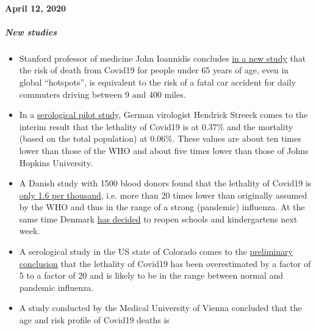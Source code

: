 \hypertarget{april-12-2020}{%
\paragraph{April 12, 2020}\label{april-12-2020}}

\hypertarget{new-studies}{%
\subparagraph{\texorpdfstring{\textbf{New
studies}}{New studies}}\label{new-studies}}

\begin{itemize}
\tightlist
\item
  Stanford professor of medicine John Ioannidis concludes
  \href{https://www.medrxiv.org/content/10.1101/2020.04.05.20054361v1}{in
  a new study} that the risk of death from Covid19 for people under 65
  years of age, even in global ``hotspots'', is equivalent to the risk
  of a fatal car accident for daily commuters driving between 9 and 400
  miles.
\item
  In a
  \href{https://www.t-online.de/gesundheit/krankheiten-symptome/id_87680236/lockerung-der-corona-massnahmen-ergebnisse-der-heinsberg-studie-machen-hoffnung.html}{serological
  pilot study}, German virologist Hendrick Streeck comes to the interim
  result that the lethality of Covid19 is at 0.37\% and the mortality
  (based on the total population) at 0.06\%. These values are about ten
  times lower than those of the WHO and about five times lower than
  those of Johns Hopkins University.
\item
  A Danish study with 1500 blood donors found that the lethality of
  Covid19 is
  \href{https://www.dr.dk/nyheder/indland/doedelighed-skal-formentlig-taelles-i-promiller-danske-blodproever-kaster-nyt-lys}{only
  1.6 per thousand}, i.e. more than 20 times lower than originally
  assumed by the WHO and thus in the range of a strong (pandemic)
  influenza. At the same time Denmark
  \href{https://www.thelocal.dk/20200406/denmark-to-reopen-schools-and-kindergartens-next-week}{has
  decided} to reopen schools and kindergartens next week.
\item
  A serological study in the US state of Colorado comes to the
  \href{https://reason.com/2020/04/08/mass-antibody-testing-in-this-rural-colorado-county-sheds-light-on-covid-19s-prevalence-and-lethality/}{preliminary
  conclusion} that the lethality of Covid19 has been overestimated by a
  factor of 5 to a factor of 20 and is likely to be in the range between
  normal and pandemic influenza.
\item
  A study conducted by the Medical University of Vienna concluded that
  the age and risk profile of Covid19 deaths is

\end{itemize}
